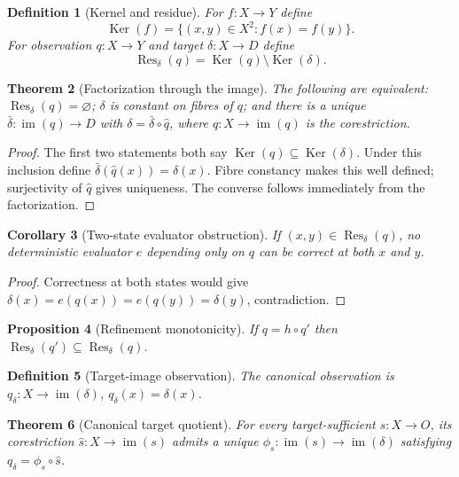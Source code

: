 \documentclass[10pt]{article}
\newtheorem{definition}{Definition}[section]
\newtheorem{theorem}[definition]{Theorem}
\newtheorem{proposition}[definition]{Proposition}
\newtheorem{corollary}[definition]{Corollary}
\newcommand{\Res}{\operatorname{Res}}
\newcommand{\Ker}{\operatorname{Ker}}
\begin{document}
\begin{definition}[Kernel and residue]
For $f:X\to Y$ define
\[
\Ker(f)=\{(x,y)\in X^2:f(x)=f(y)\}.
\]
For observation $q:X\to Y$ and target $\delta:X\to D$ define
\[
\Res_\delta(q)=\Ker(q)\setminus\Ker(\delta).
\]
\end{definition}

\begin{theorem}[Factorization through the image]
The following are equivalent: $\Res_\delta(q)=\varnothing$; $\delta$ is constant on fibres of $q$; and there is a unique $\bar\delta:\operatorname{im}(q)\to D$ with $\delta=\bar\delta\circ\widehat q$, where $\widehat q:X\to\operatorname{im}(q)$ is the corestriction.
\end{theorem}

\begin{proof}
The first two statements both say $\Ker(q)\subseteq\Ker(\delta)$.  Under this inclusion define $\bar\delta(\widehat q(x))=\delta(x)$.  Fibre constancy makes this well defined; surjectivity of $\widehat q$ gives uniqueness.  The converse follows immediately from the factorization.
\end{proof}

\begin{corollary}[Two-state evaluator obstruction]
If $(x,y)\in\Res_\delta(q)$, no deterministic evaluator $e$ depending only on $q$ can be correct at both $x$ and $y$.
\end{corollary}

\begin{proof}
Correctness at both states would give $\delta(x)=e(q(x))=e(q(y))=\delta(y)$, contradiction.
\end{proof}

\begin{proposition}[Refinement monotonicity]
If $q=h\circ q'$ then $\Res_\delta(q')\subseteq\Res_\delta(q)$.
\end{proposition}

\begin{definition}[Target-image observation]
The canonical observation is $q_\delta:X\to\operatorname{im}(\delta)$, $q_\delta(x)=\delta(x)$.
\end{definition}

\begin{theorem}[Canonical target quotient]
For every target-sufficient $s:X\to O$, its corestriction $\widehat s:X\to\operatorname{im}(s)$ admits a unique $\phi_s:\operatorname{im}(s)\to\operatorname{im}(\delta)$ satisfying $q_\delta=\phi_s\circ\widehat s$.
\end{theorem}
\end{document}
